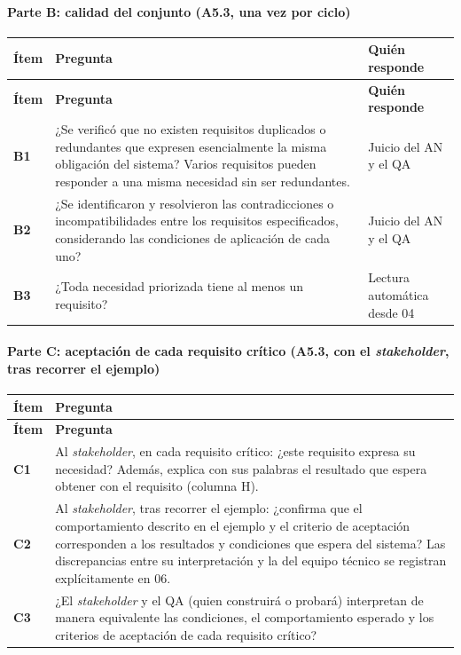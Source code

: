 \documentclass[12pt,letterpaper,oneside]{report}
\begin{document}
\paragraph{Parte B: calidad del conjunto (A5.3, una vez por ciclo)}
{\scriptsize\renewcommand{\arraystretch}{1.25}\setlength{\tabcolsep}{3pt}
\begin{xltabular}{\textwidth}{@{}>{\raggedright\arraybackslash}p{0.07\textwidth}>{\raggedright\arraybackslash}X>{\raggedright\arraybackslash}p{0.22\textwidth}@{}}
\toprule
\textbf{Ítem} & \textbf{Pregunta} & \textbf{Quién responde} \\
\midrule
\endfirsthead
\toprule
\textbf{Ítem} & \textbf{Pregunta} & \textbf{Quién responde} \\
\midrule
\endhead
\bottomrule
\endlastfoot
\textbf{B1} & ¿Se verificó que no existen requisitos duplicados o redundantes que expresen esencialmente la misma obligación del sistema? Varios requisitos pueden responder a una misma necesidad sin ser redundantes. & Juicio del AN y el QA \\
\textbf{B2} & ¿Se identificaron y resolvieron las contradicciones o incompatibilidades entre los requisitos especificados, considerando las condiciones de aplicación de cada uno? & Juicio del AN y el QA \\
\textbf{B3} & ¿Toda necesidad priorizada tiene al menos un requisito? & Lectura automática desde 04 \\
\end{xltabular}}

\paragraph{Parte C: aceptación de cada requisito crítico (A5.3, con el \textit{stakeholder}, tras recorrer el ejemplo)}
{\scriptsize\renewcommand{\arraystretch}{1.25}\setlength{\tabcolsep}{3pt}
\begin{xltabular}{\textwidth}{@{}>{\raggedright\arraybackslash}p{0.07\textwidth}>{\raggedright\arraybackslash}X@{}}
\toprule
\textbf{Ítem} & \textbf{Pregunta} \\
\midrule
\endfirsthead
\toprule
\textbf{Ítem} & \textbf{Pregunta} \\
\midrule
\endhead
\bottomrule
\endlastfoot
\textbf{C1} & Al \textit{stakeholder}, en cada requisito crítico: ¿este requisito expresa su necesidad? Además, explica con sus palabras el resultado que espera obtener con el requisito (columna H). \\
\textbf{C2} & Al \textit{stakeholder}, tras recorrer el ejemplo: ¿confirma que el comportamiento descrito en el ejemplo y el criterio de aceptación corresponden a los resultados y condiciones que espera del sistema? Las discrepancias entre su interpretación y la del equipo técnico se registran explícitamente en 06. \\
\textbf{C3} & ¿El \textit{stakeholder} y el QA (quien construirá o probará) interpretan de manera equivalente las condiciones, el comportamiento esperado y los criterios de aceptación de cada requisito crítico? \\
\end{xltabular}}
\end{document}
